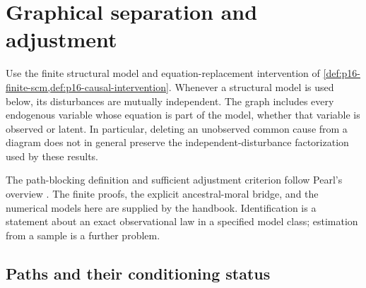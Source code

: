 \section{Graphical separation and adjustment}
\label{sec:p16-graphical-separation-adjustment}

Use the finite structural model and equation-replacement intervention of
\cref{def:p16-finite-scm,def:p16-causal-intervention}. Whenever a
structural model is used below, its disturbances are mutually independent.
The graph includes every endogenous variable whose equation is part of
the model, whether that variable is observed or latent. In particular,
deleting an unobserved common cause from a diagram does not in general
preserve the independent-disturbance factorization used by these results.

The path-blocking definition and sufficient adjustment criterion follow
Pearl's overview \cite[Definition~1, p.~106; Definition~3 and Eq.~(25),
pp.~114--115]{Pearl2009CausalOverview}. The finite proofs, the explicit
ancestral-moral bridge, and the numerical models here are supplied by
the handbook. Identification is a statement about an exact observational
law in a specified model class; estimation from a sample is a further
problem.

\subsection{Paths and their conditioning status}

